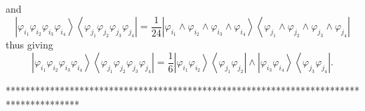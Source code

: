 \documentclass[aps,preprint]{revtex4}%
\begin{document}
and%
\begin{equation}
\left\vert \varphi_{i_{1}}\varphi_{i_{2}}\varphi_{i_{3}}\varphi_{i_{4}%
}\right\rangle \left\langle \varphi_{j_{1}}\varphi_{j_{2}}\varphi_{j_{3}%
}\varphi_{j_{4}}\right\vert =\frac{1}{24}\left\vert \varphi_{i_{1}}%
\wedge\varphi_{i_{2}}\wedge\varphi_{i_{3}}\wedge\varphi_{i_{4}}\right\rangle
\left\langle \varphi_{j_{1}}\wedge\varphi_{j_{2}}\wedge\varphi_{j_{3}}%
\wedge\varphi_{j_{4}}\right\vert
\end{equation}
thus giving%
\begin{equation}
\left\vert \varphi_{i_{1}}\varphi_{i_{2}}\varphi_{i_{3}}\varphi_{i_{4}%
}\right\rangle \left\langle \varphi_{j_{1}}\varphi_{j_{2}}\varphi_{j_{3}%
}\varphi_{j_{4}}\right\vert =\frac{1}{6}\left\vert \varphi_{i_{1}}%
\varphi_{i_{2}}\right\rangle \left\langle \varphi_{j_{1}}\varphi_{j_{2}%
}\right\vert \wedge\left\vert \varphi_{i_{3}}\varphi_{i_{4}}\right\rangle
\left\langle \varphi_{j_{3}}\varphi_{j_{4}}\right\vert .
\end{equation}


***************************************************************************************
\end{document}
